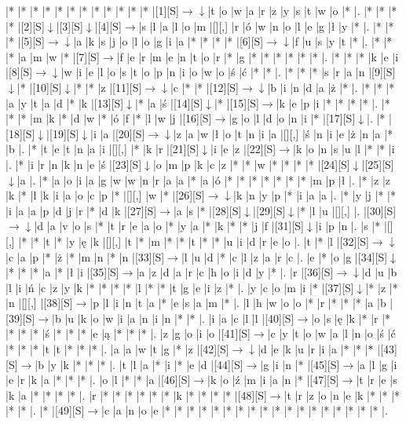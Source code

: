 \documentclass[11pt]{article}
\newcommand\drarr{$\rightarrow \!\!\!\!\! \downarrow$}
\newcommand\rarr{$\rightarrow$}
\newcommand\darr{$\downarrow$}
\begin{document}
\noindent\begin{Puzzle}{24}{27}|*	|*	|*	|*	|*	|*	|*	|*	|*	|*	|*	|*	|[1][S]\drarr	|t	|o	|w	|a	|r	|z	|y	|s	|t	|w	|o	|*	|.
|*	|*	|*	|*	|[2][S]\darr	|[3][S]\darr	|[4][S]\rarr	|s	|l	|a	|l	|o	|m	|[][,]{ }	|r	|ó	|w	|n	|o	|l	|e	|g	|ł	|y	|*	|.
|*	|*	|*	|[5][S]\drarr	|a	|k	|s	|j	|o	|l	|o	|g	|i	|a	|*	|*	|*	|*	|[6][S]\drarr	|f	|u	|s	|y	|t	|*	|.
|*	|*	|*	|a	|m	|w	|*	|[7][S]\rarr	|f	|e	|r	|m	|e	|n	|t	|o	|r	|*	|g	|*	|*	|*	|*	|*	|*	|.
|*	|*	|*	|k	|e	|i	|[8][S]\drarr	|w	|i	|e	|l	|o	|s	|t	|o	|p	|n	|i	|o	|w	|o	|ś	|ć	|*	|*	|.
|*	|*	|*	|s	|r	|a	|n	|[9][S]\darr	|*	|[10][S]\darr	|*	|*	|z	|[11][S]\drarr	|c	|*	|*	|[12][S]\drarr	|b	|i	|n	|d	|a	|ż	|*	|.
|*	|*	|*	|a	|y	|t	|a	|d	|*	|k	|[13][S]\darr	|*	|a	|ś	|[14][S]\darr	|*	|[15][S]\rarr	|k	|e	|p	|i	|*	|*	|*	|*	|.
|*	|*	|*	|m	|k	|*	|d	|w	|*	|ó	|f	|*	|l	|w	|j	|[16][S]\rarr	|g	|o	|l	|d	|o	|n	|i	|*	|[17][S]\darr	|.
|*	|[18][S]\darr	|[19][S]\darr	|i	|a	|[20][S]\drarr	|z	|a	|w	|ł	|o	|t	|n	|i	|a	|[][,]{ }	|ś	|n	|i	|e	|ż	|n	|a	|*	|b	|.
|*	|t	|e	|t	|n	|a	|i	|[][,]{ }	|*	|k	|r	|[21][S]\darr	|i	|e	|z	|[22][S]\rarr	|k	|o	|n	|s	|u	|l	|*	|*	|i	|.
|*	|i	|r	|n	|k	|n	|e	|ś	|[23][S]\darr	|o	|m	|p	|k	|c	|z	|*	|*	|w	|*	|*	|*	|*	|[24][S]\darr	|[25][S]\darr	|a	|.
|*	|a	|o	|i	|a	|g	|w	|w	|n	|r	|a	|a	|*	|a	|ó	|*	|*	|*	|*	|*	|*	|*	|m	|p	|ł	|.
|*	|z	|z	|k	|*	|l	|k	|i	|a	|o	|c	|p	|*	|[][,]{ }	|w	|*	|[26][S]\drarr	|k	|n	|y	|p	|*	|i	|a	|a	|.
|*	|y	|j	|*	|*	|i	|a	|a	|p	|d	|j	|r	|*	|d	|k	|[27][S]\rarr	|a	|s	|*	|[28][S]\darr	|[29][S]\darr	|*	|l	|u	|[][,]{ }	|.
|[30][S]\drarr	|d	|a	|v	|o	|s	|*	|t	|r	|e	|a	|o	|*	|y	|a	|*	|k	|*	|*	|j	|f	|[31][S]\darr	|i	|p	|n	|.
|s	|*	|[][,]{ }	|*	|*	|t	|*	|y	|ę	|k	|[][,]{ }	|t	|*	|m	|*	|*	|t	|*	|*	|u	|i	|d	|r	|e	|o	|.
|t	|*	|l	|[32][S]\drarr	|c	|a	|p	|*	|ż	|*	|m	|n	|*	|n	|[33][S]\rarr	|l	|u	|d	|*	|c	|l	|z	|a	|r	|c	|.
|e	|*	|o	|g	|[34][S]\darr	|*	|*	|*	|a	|*	|ł	|i	|[35][S]\rarr	|a	|z	|d	|a	|r	|c	|h	|o	|i	|d	|y	|*	|.
|r	|[36][S]\drarr	|d	|u	|b	|l	|i	|ń	|c	|z	|y	|k	|*	|*	|*	|*	|l	|*	|*	|t	|g	|e	|i	|z	|*	|.
|y	|c	|o	|m	|i	|*	|[37][S]\darr	|*	|z	|*	|n	|[][,]{ }	|[38][S]\rarr	|p	|l	|i	|n	|t	|a	|*	|e	|s	|a	|m	|*	|.
|l	|h	|w	|o	|o	|*	|r	|*	|*	|*	|a	|b	|[39][S]\rarr	|b	|u	|k	|o	|w	|i	|a	|n	|i	|n	|*	|*	|.
|i	|a	|c	|l	|l	|[40][S]\rarr	|o	|s	|ę	|k	|*	|r	|*	|*	|*	|*	|ś	|*	|*	|*	|e	|ą	|*	|*	|*	|.
|z	|g	|o	|i	|o	|[41][S]\rarr	|c	|y	|t	|o	|w	|a	|l	|n	|o	|ś	|ć	|*	|*	|*	|t	|t	|*	|*	|*	|.
|a	|a	|w	|t	|g	|*	|z	|[42][S]\drarr	|d	|e	|k	|u	|r	|i	|a	|*	|*	|*	|[43][S]\rarr	|b	|y	|k	|*	|*	|*	|.
|t	|l	|a	|*	|i	|*	|e	|d	|[44][S]\rarr	|g	|i	|n	|*	|[45][S]\rarr	|a	|l	|g	|i	|e	|r	|k	|a	|*	|*	|*	|.
|o	|l	|*	|*	|a	|[46][S]\rarr	|k	|o	|ź	|m	|i	|a	|n	|*	|[47][S]\rarr	|t	|r	|e	|s	|k	|a	|*	|*	|*	|*	|.
|r	|*	|*	|*	|*	|*	|*	|k	|*	|*	|*	|*	|[48][S]\rarr	|t	|r	|z	|o	|n	|e	|k	|*	|*	|*	|*	|*	|.
|*	|[49][S]\rarr	|c	|a	|n	|o	|e	|*	|*	|*	|*	|*	|*	|*	|*	|*	|*	|*	|*	|*	|*	|*	|*	|*	|*	|.\end{Puzzle}
\end{document}
